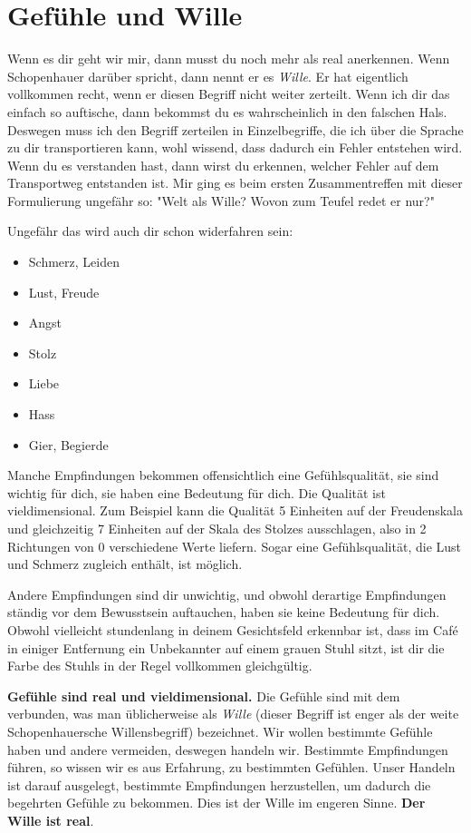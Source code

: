 \documentclass[12pt]{book}
\begin{document}
\section{Gefühle und Wille}

Wenn es dir geht wir mir, dann musst du noch mehr als real anerkennen. Wenn Schopenhauer darüber spricht, dann nennt er es \emph{Wille}. Er hat eigentlich vollkommen recht, wenn er diesen Begriff nicht weiter zerteilt. Wenn ich dir das einfach so auftische, dann bekommst du es wahrscheinlich in den falschen Hals. Deswegen muss ich den Begriff zerteilen in Einzelbegriffe, die ich über die Sprache zu dir transportieren kann, wohl wissend, dass dadurch ein Fehler entstehen wird. Wenn du es verstanden hast, dann wirst du erkennen, welcher Fehler auf dem Transportweg entstanden ist. Mir ging es beim ersten Zusammentreffen mit dieser Formulierung ungefähr so: "Welt als Wille? Wovon zum Teufel redet er nur?"

Ungefähr das wird auch dir schon widerfahren sein:
\begin{itemize}
\item Schmerz, Leiden
\item Lust, Freude
\item Angst
\item Stolz
\item Liebe
\item Hass
\item Gier, Begierde
\end{itemize}

Manche Empfindungen bekommen offensichtlich eine Gefühlsqualität, sie sind wichtig für dich, sie haben eine Bedeutung für dich. Die Qualität ist vieldimensional. Zum Beispiel kann die Qualität 5 Einheiten auf der Freudenskala und gleichzeitig 7 Einheiten auf der Skala des Stolzes ausschlagen, also in 2 Richtungen von 0 verschiedene Werte liefern. Sogar eine Gefühlsqualität, die Lust und Schmerz zugleich enthält, ist möglich. 

Andere Empfindungen sind dir unwichtig, und obwohl derartige Empfindungen ständig vor dem Bewusstsein auftauchen, haben sie keine Bedeutung für dich. Obwohl vielleicht stundenlang in deinem Gesichtsfeld erkennbar ist, dass im Café in einiger Entfernung ein Unbekannter auf einem grauen Stuhl sitzt, ist dir die Farbe des Stuhls in der Regel vollkommen gleichgültig.

\textbf{Gefühle sind real und vieldimensional.} Die Gefühle sind mit dem verbunden, was man üblicherweise als \emph{Wille} (dieser Begriff ist enger als der weite Schopenhauersche Willensbegriff) bezeichnet. Wir wollen bestimmte Gefühle haben und andere vermeiden, deswegen handeln wir. Bestimmte Empfindungen führen, so wissen wir es aus Erfahrung, zu bestimmten Gefühlen. Unser Handeln ist darauf ausgelegt, bestimmte Empfindungen herzustellen, um dadurch die begehrten Gefühle zu bekommen. Dies ist der Wille im engeren Sinne. \textbf{Der Wille ist real}.
\end{document}
